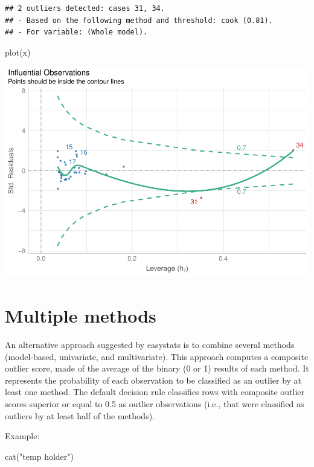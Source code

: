 \documentclass[
]{article}
\newenvironment{Shaded}{\begin{snugshade}}{\end{snugshade}}
\newcommand{\FunctionTok}[1]{\textcolor[rgb]{0.00,0.00,0.00}{#1}}
\newcommand{\NormalTok}[1]{#1}
\newcommand{\StringTok}[1]{\textcolor[rgb]{0.31,0.60,0.02}{#1}}
\begin{document}
\begin{verbatim}
## 2 outliers detected: cases 31, 34.
## - Based on the following method and threshold: cook (0.81).
## - For variable: (Whole model).
\end{verbatim}

\begin{Shaded}
\begin{Highlighting}[]
\FunctionTok{plot}\NormalTok{(x)}
\end{Highlighting}
\end{Shaded}

\includegraphics{paper_files/figure-latex/model-based outliers-1.pdf}

\hypertarget{multiple-methods}{%
\section{Multiple methods}\label{multiple-methods}}

An alternative approach suggested by easystats is to combine several
methods (model-based, univariate, and multivariate). This approach
computes a composite outlier score, made of the average of the binary (0
or 1) results of each method. It represents the probability of each
observation to be classified as an outlier by at least one method. The
default decision rule classifies rows with composite outlier scores
superior or equal to 0.5 as outlier observations (i.e., that were
classified as outliers by at least half of the methods).

Example:

\begin{Shaded}
\begin{Highlighting}[]
\FunctionTok{cat}\NormalTok{(}\StringTok{"temp holder"}\NormalTok{)}
\end{Highlighting}
\end{Shaded}
\end{document}
